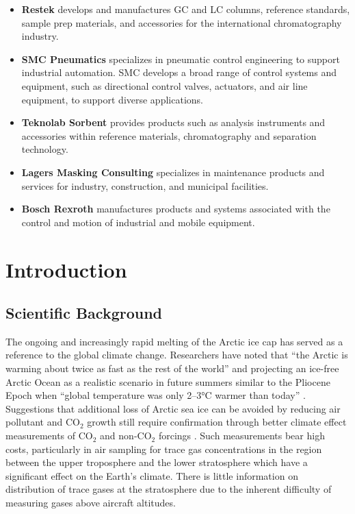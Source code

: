 \documentclass[a4paper,12pt,twoside]{article}
\begin{document}
\begin{itemize}
  \item \textbf{Restek} develops and manufactures GC and LC columns, reference standards, sample prep materials, and accessories for the international chromatography industry. 
  \item \textbf{SMC Pneumatics} specializes in pneumatic control engineering to support industrial automation. SMC develops a broad range of control systems and equipment, such as directional control valves, actuators, and air line equipment, to support diverse applications.
  \item \textbf{Teknolab Sorbent} provides products such as  analysis instruments and accessories within reference materials, chromatography and separation technology.
  \item \textbf{Lagers Masking Consulting} specializes in maintenance products and services for industry, construction, and municipal facilities.
  \item \textbf{Bosch Rexroth} manufactures products and systems associated with the control and motion of industrial and mobile equipment.
\end{itemize}

\pagestyle{SED}
\raggedbottom  %

%

\section{Introduction}
\subsection{Scientific Background}

The ongoing and increasingly rapid melting of the Arctic ice cap has served as a reference to the global climate change. Researchers have noted that \enquote{the Arctic is warming about twice as fast as the rest of the world} \cite{Perkins} and projecting an ice-free Arctic Ocean as a realistic scenario in future summers similar to the Pliocene Epoch when \enquote{global temperature was only 2–3°C warmer than today} \cite{Trace}. Suggestions that additional loss of Arctic sea ice can be avoided by reducing air pollutant and CO$_{2}$ growth still require confirmation through better climate effect measurements of CO$_{2}$ and non-CO$_{2}$ forcings \cite{Trace}. Such measurements bear high costs, particularly in air sampling for trace gas concentrations in the region between the upper troposphere and the lower stratosphere which have a significant effect on the Earth's climate. There is little information on distribution of trace gases at the stratosphere due to the inherent difficulty of measuring gases above aircraft altitudes.
\end{document}
